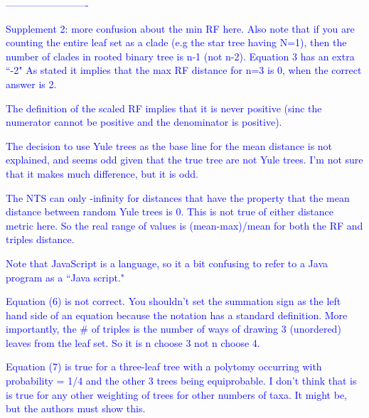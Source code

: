 \documentclass[11pt]{letter}
\begin{document}
\begin{letter}{}

\textcolor{blue}{-------------------------}

\textcolor{blue}{Supplement 2:}
\textcolor{blue}{more confusion about the min RF here. Also note that if you are counting the entire leaf set as a clade (e.g the star tree having N=1), then the number of clades in rooted binary tree is n-1 (not n-2). Equation 3 has an extra ``-2" As stated it implies that the max RF distance for n=3 is 0, when the correct answer is 2.}



\textcolor{blue}{The definition of the scaled RF implies that it is never positive (sinc the numerator cannot be positive and the denominator is positive).}



\textcolor{blue}{The decision to use Yule trees as the base line for the mean distance is not explained, and seems odd given that the true tree are not Yule trees. I'm not sure that it makes much difference, but it is odd.}



\textcolor{blue}{The NTS can only -infinity for distances that have the property that the mean distance between random Yule trees is 0. This is not true of either distance metric here. So the real range of values is (mean-max)/mean for both the RF and triples distance.}



\textcolor{blue}{Note that JavaScript is a language, so it a bit confusing to refer to a Java program as a ``Java script."}



\textcolor{blue}{Equation (6) is not correct. You shouldn't set the summation sign as the left hand side of an equation because the notation has a standard definition. More importantly, the $\#$ of triples is the number of ways of drawing 3 (unordered) leaves from the leaf set. So it is n choose 3 not n choose 4.}



\textcolor{blue}{Equation (7) is true for a three-leaf tree with a polytomy occurring with probability = 1/4 and the other 3 trees being equiprobable. I don't think that is is true for any other weighting of trees for other numbers of taxa. It might be, but the authors must show this.}


\end{letter}
\end{document}
